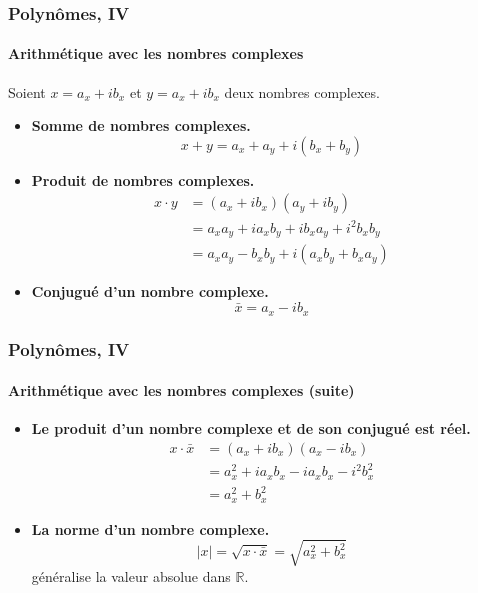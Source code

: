 \documentclass[10pt,notheorems]{beamer}
\theoremstyle{plain}
\theoremstyle{definition} %
\begin{document}
\begin{frame}
  \frametitle{Polynômes, IV}
  \framesubtitle{Arithmétique avec les nombres complexes}
  \hypertarget{slide_polynome_2_imaginaire_2}{}

  \bigskip

  Soient $x = a_x + i b_x$ et $y = a_x + i b_x$ deux nombres complexes.

  \bigskip

  \begin{itemize}

  \item \textbf{Somme de nombres complexes.}
    \[
      x+y = a_x+a_y + i(b_x+b_y)
    \]

    \bigskip

  \item \textbf{Produit de nombres complexes.}
    \[
      \begin{split}
        x \cdot y &= (a_x + i b_x)(a_y + i b_y)\\
        &= a_xa_y + i a_xb_y + ib_xa_y + i^2b_xb_y\\
        &= a_xa_y-b_xb_y + i(a_xb_y + b_xa_y)
      \end{split}
    \]

    \bigskip

  \item \textbf{Conjugué d'un nombre complexe.}
    \[
      \bar x = a_x - i b_x
    \]

  \end{itemize}

\end{frame}


\begin{frame}
  \frametitle{Polynômes, IV}
  \framesubtitle{Arithmétique avec les nombres complexes (suite)}
  \hypertarget{slide_polynome_2_imaginaire_3}{}

  \bigskip

  \begin{itemize}

  \item \textbf{Le produit d'un nombre complexe et de son conjugué est réel.}
    \[
      \begin{split}
        x \cdot \bar x &= (a_x + i b_x)(a_x - i b_x)\\
        &= a_x^2 + i a_xb_x - i a_x b_x - i^2 b_x^2\\
        &= a_x^2 + b_x^2
      \end{split}
    \]

    \bigskip

  \item \textbf{La norme d'un nombre complexe.}
    \[
      |x| = \sqrt{x \cdot \bar x} = \sqrt{a_x^2 + b_x^2}
    \]
    généralise la valeur absolue dans $\mathbb R$.

  \end{itemize}

\end{frame}
\end{document}
